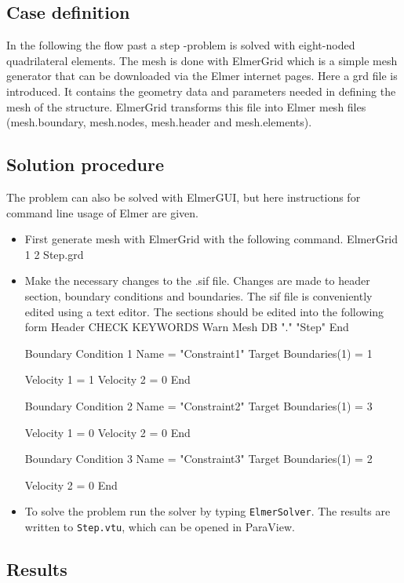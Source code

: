 \subsection*{Case definition}

In the following the flow past a step -problem is solved with
eight-noded quadrilateral elements. The mesh is done with ElmerGrid
which is a simple mesh generator that can be downloaded via the Elmer
internet pages. Here a grd file is introduced. It contains the
geometry data and parameters needed in defining the mesh of the
structure. ElmerGrid transforms this file into Elmer mesh files
(mesh.boundary, mesh.nodes, mesh.header and mesh.elements).



\subsection*{Solution procedure}

The problem can also be solved with ElmerGUI, but here instructions for
command line usage of Elmer are given.
\begin{itemize}
\item First generate mesh with ElmerGrid with the following command.
\ttbegin 
ElmerGrid 1 2 Step.grd
\ttend

\item Make the necessary changes to the .sif file. Changes are made to
header section, boundary conditions and boundaries. The sif file is
conveniently edited using a text editor. The sections should be edited
into the following form
\ttbegin 
Header
  CHECK KEYWORDS Warn
  Mesh DB "." "Step"
End

Boundary Condition 1
  Name = "Constraint1"
  Target Boundaries(1) = 1

  Velocity 1 = 1
  Velocity 2 = 0
End

Boundary Condition 2
  Name = "Constraint2"
  Target Boundaries(1) = 3

  Velocity 1 = 0
  Velocity 2 = 0
End

Boundary Condition 3
  Name = "Constraint3"
  Target Boundaries(1) = 2

  Velocity 2 = 0
End
\ttend
\item To solve the problem run the solver by typing {\tt ElmerSolver}. The
results are written to {\tt Step.vtu}, which can be opened in ParaView.
\end{itemize}


\subsection*{Results}


